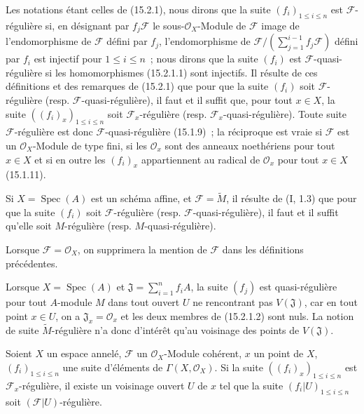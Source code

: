 \begin{env}[15.2.2]
\label{0.15.2.2-fr}
Les notations étant celles de (15.2.1), nous dirons que la suite
$(f_i)_{1\leq i\leq n}$ est $\mathscr{F}$-régulière si, en désignant par
$f_j\mathscr{F}$ le sous-$\mathcal{O}_X$-Module de $\mathscr{F}$ image de
l'endomorphisme de $\mathscr{F}$ défini par $f_j$, l'endomorphisme de
$\mathscr{F}/(\sum_{j=1}^{i-1}f_j\mathscr{F})$ défini par $f_i$ est injectif
pour $1\leq i\leq n$~; nous dirons que la suite $(f_i)$ est
$\mathscr{F}$-quasi-régulière si les homomorphismes (15.2.1.1) sont injectifs.
Il résulte de ces définitions et des remarques de (15.2.1) que pour que la
suite $(f_i)$ soit $\mathscr{F}$-régulière (resp.
$\mathscr{F}$-quasi-régulière), il faut et il suffit que, pour tout $x\in X$,
la suite $((f_i)_x)_{1\leq i\leq n}$ soit $\mathscr{F}_x$-régulière (resp.
$\mathscr{F}_x$-quasi-régulière). Toute suite $\mathscr{F}$-régulière est donc
$\mathscr{F}$-quasi-régulière (15.1.9)~; la réciproque est vraie si
$\mathscr{F}$ est un $\mathcal{O}_X$-Module de type fini, si les
$\mathcal{O}_x$ sont des anneaux noethériens pour tout $x\in X$ et si en outre
les $(f_i)_x$ appartiennent au radical de $\mathcal{O}_x$ pour tout $x\in X$
(15.1.11).

Si $X=\operatorname{Spec}(A)$ est un schéma affine, et
$\mathscr{F}=\widetilde{M}$, il
résulte de (I, 1.3) que pour que la suite $(f_i)$ soit
$\mathscr{F}$-régulière (resp. $\mathscr{F}$-quasi-régulière), il faut et il
suffit qu'elle soit $M$-régulière (resp. $M$-quasi-régulière).

Lorsque $\mathscr{F}=\mathcal{O}_X$, on supprimera la mention de
$\mathscr{F}$ dans les définitions précédentes.
\end{env}

\begin{remark}[15.2.3]
\label{0.15.2.3-fr}
Lorsque $X=\operatorname{Spec}(A)$ et
$\mathfrak{J}=\sum_{i=1}^n f_iA$, la suite $(f_j)$ est
quasi-régulière pour tout $A$-module $M$ dans tout ouvert $U$ ne rencontrant
pas $V(\mathfrak{J})$, car en tout point $x\in U$, on a
$\mathfrak{J}_x=\mathcal{O}_x$ et les deux membres de (15.2.1.2) sont nuls. La
notion de suite $\widetilde{M}$-régulière n'a donc d'intérêt qu'au voisinage
des points de $V(\mathfrak{J})$.
\end{remark}

\begin{proposition}[15.2.4]
\label{0.15.2.4-fr}
Soient $X$ un espace annelé, $\mathscr{F}$ un $\mathcal{O}_X$-Module cohérent,
$x$ un point de $X$, $(f_i)_{1\leq i\leq n}$ une suite d'éléments de
$\Gamma(X,\mathcal{O}_X)$. Si la suite $((f_i)_x)_{1\leq i\leq n}$ est
$\mathscr{F}_x$-régulière, il existe un voisinage ouvert $U$ de $x$ tel que la
suite $(f_i|U)_{1\leq i\leq n}$ soit $(\mathscr{F}|U)$-régulière.
\end{proposition}

